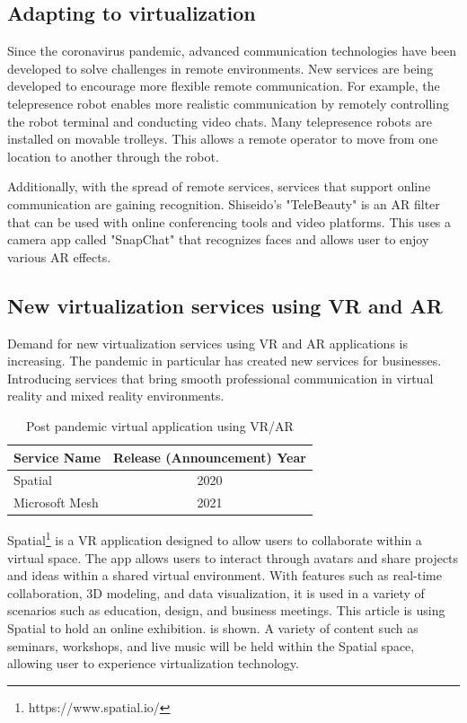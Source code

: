 \documentclass[12pt]{article}
\begin{document}
\subsection{Adapting to virtualization}
Since the coronavirus pandemic, advanced communication technologies have been
developed to solve challenges in remote environments. New services are being
developed to encourage more flexible remote communication. For example, the
telepresence robot \cite{telepresence_robot}
enables more realistic communication by remotely controlling the robot terminal
and conducting video chats. Many telepresence robots are installed on movable
trolleys. This allows a remote operator to move from one location to another
through the robot.

Additionally, with the spread of remote services, services that support online
communication are gaining recognition. Shiseido's "TeleBeauty"
\cite{telebeauty} is
an AR filter that can
be used with online conferencing tools and video platforms. This uses a camera
app called "SnapChat" that recognizes faces and allows user to enjoy various AR
effects.

\subsection{New virtualization services using VR and AR}
Demand for new virtualization services using VR and AR applications is
increasing. The pandemic in particular has
created new services for businesses. Introducing services that bring smooth
professional communication in virtual reality and mixed reality environments.

\begin{table}[h]
    \begin{center}
        \begin{tabular}{|l|c|} \hline
            Service Name   & Release (Announcement) Year \\ \hline
            Spatial        & 2020                        \\
            Microsoft Mesh & 2021                        \\ \hline
        \end{tabular}
        \caption{Post pandemic virtual application using VR/AR}
    \end{center}
\end{table}

Spatial\footnote{https://www.spatial.io/} is a VR application designed to allow
users to collaborate within a
virtual space. The app allows users to interact through avatars and share
projects and ideas within a shared virtual environment. With features such as
real-time collaboration, 3D modeling, and data visualization, it is used in a
variety of scenarios such as education, design, and business meetings. This
article \cite{spatial_example} is using Spatial to hold an online exhibition.
is shown.
A variety of content
such as seminars, workshops, and live music will be held within the Spatial
space, allowing user to experience virtualization technology.
\end{document}

